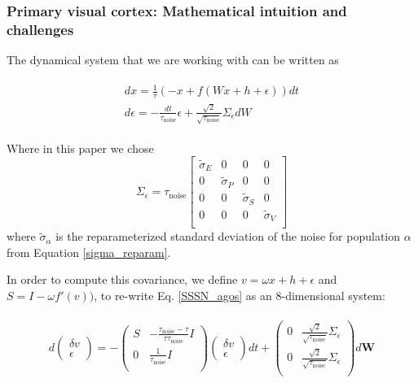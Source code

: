 \documentclass[11pt]{article}
\begin{document}
\subsubsection{Primary visual cortex: Mathematical intuition and challenges}\label{methods_V1_complexity}

The dynamical system that we are working with can be written as 

\begin{align}\label{SSSN_agos}
\begin{split}
 dx=\frac{1}{\tau}(-x+f(W x +h+\epsilon)) dt\\
d \epsilon=-\frac{dt}{\tau_{\text{noise}}}\epsilon+\frac{\sqrt{2}}{\sqrt{\tau_{\text{noise}}}}\Sigma_\epsilon dW
\end{split}
\end{align}

Where in this paper we chose 
\begin{equation}
\Sigma_\epsilon=\tau_{\text{noise}} 
\begin{bmatrix} 
\tilde{\sigma}_E & 0 & 0 & 0 \\
0 & \tilde{\sigma}_P & 0 & 0 \\
0 & 0 & \tilde{\sigma}_S & 0 \\
0 & 0 & 0 & \tilde{\sigma}_V \\
\end{bmatrix}
\end{equation}
where $\tilde{\sigma}_\alpha$ is the reparameterized standard deviation of the noise for population $\alpha$ from Equation \ref{sigma_reparam}.

In order to compute this covariance, we define $v=\omega x +h+\epsilon$ and $S=I-\omega f'(v))$, to re-write Eq. \eqref{SSSN_agos} as an 8-dimensional system:

\begin{align}
\begin{split}
d\begin{pmatrix}
\delta v \\
 \epsilon
\end{pmatrix}= -
\begin{pmatrix}
	S &- \frac{\tau_{\text{noise}}-\tau}{\tau \tau_{\text{noise}}}I\\
	 0&\frac{1}{\tau_{\text{noise}}}I\\
\end{pmatrix}
\begin{pmatrix}
	\delta v\\
	\epsilon 
\end{pmatrix} 
dt +
\begin{pmatrix}
	0&\frac{\sqrt{2}}{\sqrt{\tau_{\text{noise}}}} \Sigma_\epsilon\\
	0&\frac{\sqrt{2}}{\sqrt{\tau_{\text{noise}}}} \Sigma_\epsilon \\
\end{pmatrix}    d\mathbf{W} 
\end{split}
\end{align}
\end{document}
